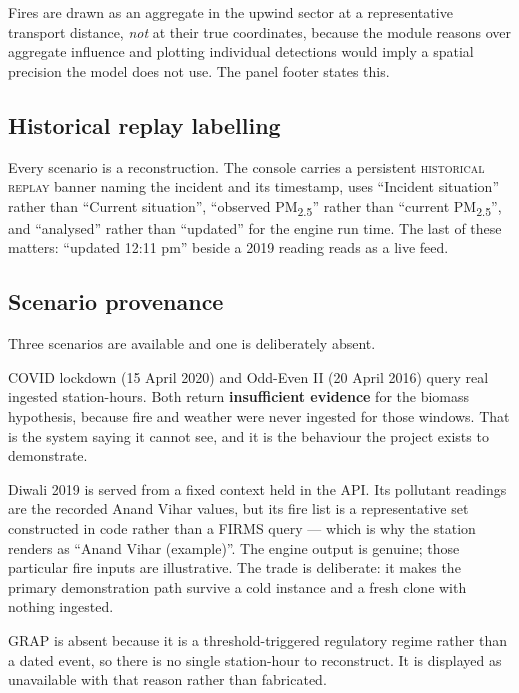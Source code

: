 \documentclass[11pt,a4paper]{article}
\newcommand{\PM}{PM\textsubscript{2.5}}
\begin{document}
Fires are drawn as an aggregate in the upwind sector at a representative transport
distance, \emph{not} at their true coordinates, because the module reasons over
aggregate influence and plotting individual detections would imply a spatial
precision the model does not use. The panel footer states this.

\subsection{Historical replay labelling}

Every scenario is a reconstruction. The console carries a persistent
\textsc{historical replay} banner naming the incident and its timestamp, uses
``Incident situation'' rather than ``Current situation'', ``observed \PM{}'' rather
than ``current \PM{}'', and ``analysed'' rather than ``updated'' for the engine run
time. The last of these matters: ``updated 12:11 pm'' beside a 2019 reading reads as
a live feed.

\subsection{Scenario provenance}

Three scenarios are available and one is deliberately absent.

COVID lockdown (15 April 2020) and Odd-Even II (20 April 2016) query real ingested
station-hours. Both return \textbf{insufficient evidence} for the biomass
hypothesis, because fire and weather were never ingested for those windows. That is
the system saying it cannot see, and it is the behaviour the project exists to
demonstrate.

Diwali 2019 is served from a fixed context held in the API. Its pollutant readings
are the recorded Anand Vihar values, but its fire list is a representative set
constructed in code rather than a FIRMS query --- which is why the station renders
as ``Anand Vihar (example)''. The engine output is genuine; those particular fire
inputs are illustrative. The trade is deliberate: it makes the primary demonstration
path survive a cold instance and a fresh clone with nothing ingested.

GRAP is absent because it is a threshold-triggered regulatory regime rather than a
dated event, so there is no single station-hour to reconstruct. It is displayed as
unavailable with that reason rather than fabricated.

\end{document}
